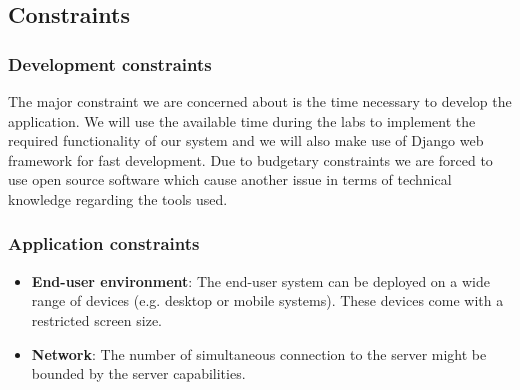 \documentclass{sig-alt-release2}
\begin{document}
\subsection{Constraints}

\subsubsection{Development constraints}

The major constraint we are concerned about is the time necessary to develop 
the application. We will use the available time during the labs to implement 
the required functionality of our system and we will also make use of Django 
web framework for fast development. Due to budgetary constraints we are forced 
to use open source software which cause another issue in terms of technical 
knowledge regarding the tools used.

\subsubsection{Application constraints}
\begin{itemize}
	\item \textbf{End-user environment}: The end-user system can be deployed
	on a wide range of devices (e.g. desktop or mobile systems). These devices
	come with a restricted screen size.
	\item \textbf{Network}: The number of simultaneous connection to the server
	might be bounded by the server capabilities.
\end{itemize}
\end{document}
